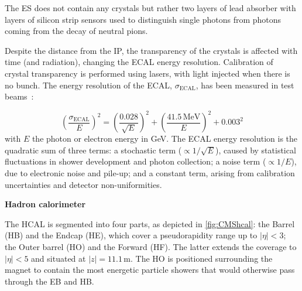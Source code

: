 The ES does not contain any crystals but rather two layers of lead absorber with layers of silicon strip sensors used to distinguish single photons from photons coming from the decay of neutral pions.

\vspace{0.5 cm}

Despite the distance from the IP, the transparency of the crystals is affected with time (and radiation), changing the ECAL energy resolution. Calibration of crystal transparency is performed using lasers, with light injected when there is no bunch. The energy resolution of the ECAL, $\sigma_{\textrm{ECAL}}$, has been measured in test beams~\cite{CMSecal}:

\begin{equation}
    \left( \frac{\sigma_{\textrm{ECAL}}}{E} \right)^2 = \left( \frac{0.028}{\sqrt{E}} \right)^2 + \left( \frac{41.5 \, \textrm{MeV}}{E} \right)^2 + 0.003^2
    \label{eq:ecalresolution}
\end{equation}
with $E$ the photon or electron energy in GeV. The ECAL energy resolution is the quadratic sum of three terms: a stochastic term ($\propto 1/\sqrt{E}$), caused by statistical fluctuations in shower development and photon collection; a noise term ($\propto 1/E$), due to electronic noise and pile-up; and a constant term, arising from calibration uncertainties and detector non-uniformities.

\vspace{0.5 cm}
\noindent \textbf{Hadron calorimeter}
\vspace{0.5 cm}

The HCAL is segmented into four parts, as depicted in \cref{fig:CMShcal}: the Barrel (HB) and the Endcap (HE), which cover a pseudorapidity range up to $|\eta|<3$; the Outer barrel (HO) and the Forward (HF). The latter extends the coverage to $|\eta|<5$ and situated at $|z|=11.1 \, \textrm{m}$. The HO is positioned surrounding the magnet to contain the most energetic particle showers that would otherwise pass through the EB and HB.

\vspace{0.5 cm}

